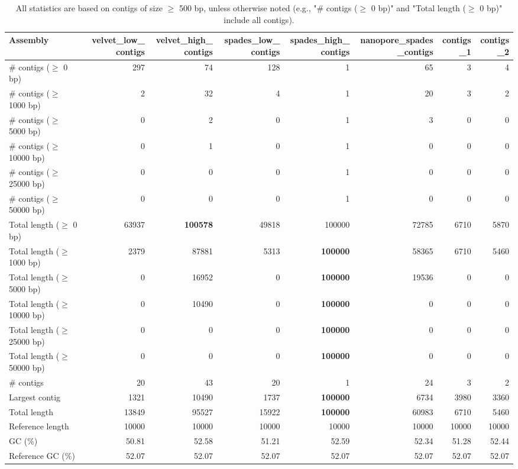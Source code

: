 \documentclass[12pt,a4paper]{article}
\begin{document}
\begin{table}[ht]
\begin{center}
\caption{All statistics are based on contigs of size $\geq$ 500 bp, unless otherwise noted (e.g., "\# contigs ($\geq$ 0 bp)" and "Total length ($\geq$ 0 bp)" include all contigs).}
\begin{tabular}{|l*{7}{|r}|}
\hline
Assembly & velvet\_low\_contigs & velvet\_high\_contigs & spades\_low\_contigs & spades\_high\_contigs & nanopore\_spades\_contigs & contigs\_1 & contigs\_2 \\ \hline
\# contigs ($\geq$ 0 bp) & 297 & 74 & 128 & 1 & 65 & 3 & 4 \\ \hline
\# contigs ($\geq$ 1000 bp) & 2 & 32 & 4 & 1 & 20 & 3 & 2 \\ \hline
\# contigs ($\geq$ 5000 bp) & 0 & 2 & 0 & 1 & 3 & 0 & 0 \\ \hline
\# contigs ($\geq$ 10000 bp) & 0 & 1 & 0 & 1 & 0 & 0 & 0 \\ \hline
\# contigs ($\geq$ 25000 bp) & 0 & 0 & 0 & 1 & 0 & 0 & 0 \\ \hline
\# contigs ($\geq$ 50000 bp) & 0 & 0 & 0 & 1 & 0 & 0 & 0 \\ \hline
Total length ($\geq$ 0 bp) & 63937 & {\bf 100578} & 49818 & 100000 & 72785 & 6710 & 5870 \\ \hline
Total length ($\geq$ 1000 bp) & 2379 & 87881 & 5313 & {\bf 100000} & 58365 & 6710 & 5460 \\ \hline
Total length ($\geq$ 5000 bp) & 0 & 16952 & 0 & {\bf 100000} & 19536 & 0 & 0 \\ \hline
Total length ($\geq$ 10000 bp) & 0 & 10490 & 0 & {\bf 100000} & 0 & 0 & 0 \\ \hline
Total length ($\geq$ 25000 bp) & 0 & 0 & 0 & {\bf 100000} & 0 & 0 & 0 \\ \hline
Total length ($\geq$ 50000 bp) & 0 & 0 & 0 & {\bf 100000} & 0 & 0 & 0 \\ \hline
\# contigs & 20 & 43 & 20 & 1 & 24 & 3 & 2 \\ \hline
Largest contig & 1321 & 10490 & 1737 & {\bf 100000} & 6734 & 3980 & 3360 \\ \hline
Total length & 13849 & 95527 & 15922 & {\bf 100000} & 60983 & 6710 & 5460 \\ \hline
Reference length & 10000 & 10000 & 10000 & 10000 & 10000 & 10000 & 10000 \\ \hline
GC (\%) & 50.81 & 52.58 & 51.21 & 52.59 & 52.34 & 51.28 & 52.44 \\ \hline
Reference GC (\%) & 52.07 & 52.07 & 52.07 & 52.07 & 52.07 & 52.07 & 52.07 \\ \hline

\end{tabular}
\end{center}
\end{table}
\end{document}
